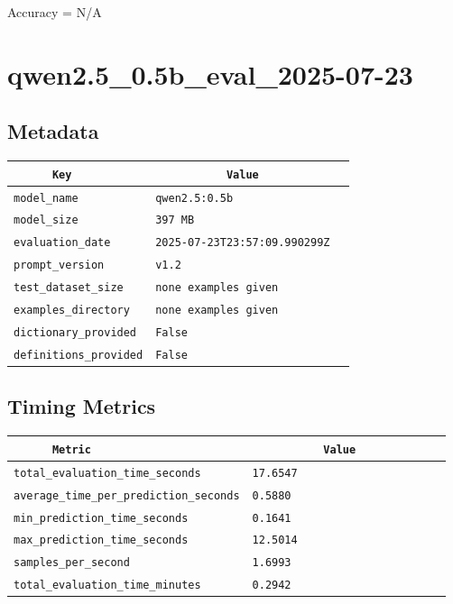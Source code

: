 \documentclass{article}
\begin{document}
\begin{center}
Accuracy = N/A
\end{center}

\section{qwen2.5\_0.5b\_eval\_2025-07-23}
\subsection{Metadata}

\begin{center}
\begin{tabular}{l | l} \hline
    \verb|      Key      | & \verb|           Value           | \\ \hline
    \hline
    \verb|model_name    | & \verb|qwen2.5:0.5b                 | \\ \hline
    \verb|model_size    | & \verb|397 MB                       | \\ \hline
    \verb|evaluation_date| & \verb|2025-07-23T23:57:09.990299Z  | \\ \hline
    \verb|prompt_version| & \verb|v1.2                         | \\ \hline
    \verb|test_dataset_size| & \verb|none examples given          | \\ \hline
    \verb|examples_directory| & \verb|none examples given          | \\ \hline
    \verb|dictionary_provided| & \verb|False                        | \\ \hline
    \verb|definitions_provided| & \verb|False                        | \\ \hline
\end{tabular}
\end{center}

\subsection{Timing Metrics}

\begin{center}
\begin{tabular}{l | l} \hline
    \verb|      Metric     | & \verb|           Value           | \\ \hline
    \hline
    \verb|total_evaluation_time_seconds| & \verb|17.6547                      | \\ \hline
    \verb|average_time_per_prediction_seconds| & \verb|0.5880                       | \\ \hline
    \verb|min_prediction_time_seconds| & \verb|0.1641                       | \\ \hline
    \verb|max_prediction_time_seconds| & \verb|12.5014                      | \\ \hline
    \verb|samples_per_second| & \verb|1.6993                       | \\ \hline
    \verb|total_evaluation_time_minutes| & \verb|0.2942                       | \\ \hline
\end{tabular}
\end{center}
\end{document}
